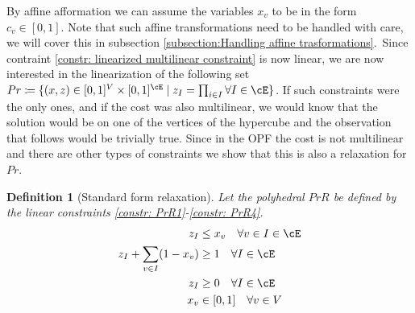 \documentclass{article}
\newcommand{\gr}[2][]{\todo[color=green!20,#1]{\textsf{G:} #2}}
\newtheorem{definition}{Definition}
\begin{document}
By affine afformation we can assume the variables \(x_v\) to be in the form \(c_v \in [0,1]\). Note that such affine transformations need to be handled with care, we will cover this in subsection \ref{subsection:Handling affine trasformations}.\
Since contraint \eqref{constr: linearized multilinear constraint} is now linear, we are now interested in the linearization of the following set \(Pr \coloneqq  \{(x,z) \in [0,1]^V \times [0,1]^{\cE} \mid z_I = \prod_{i \in I} \forall I \in \cE\}\).
If such constraints were the only ones, and if the cost was also multilinear, we would know that the solution would be on one of the vertices of the hypercube and the observation that follows would be trivially true. Since in the OPF the cost is not multilinear and there are other types of constraints we show that this is also a relaxation for \(Pr\).
\begin{definition}[Standard form relaxation]\label{def: standard form relaxation}
  Let the polyhedral \(PrR\) be defined by the linear constraints  \eqref{constr: PrR1}-\eqref{constr: PrR4}.
  \gr[]{fixalignment}
  \begin{align}
    z_I &\leq x_v   \quad\forall v \in I \in \cE \label{constr: PrR1} \\
    z_I + \sum_{v \in I}(1-x_v) &\geq 1 \quad \forall I \in \cE \label{constr: PrR2}\\
    z_I &\geq 0  \quad\forall I \in \cE \label{constr: PrR3}\\
    x_v &\in [0,1]  \quad \forall v \in V \label{constr: PrR4}
  \end{align}
\end{definition}
\end{document}

